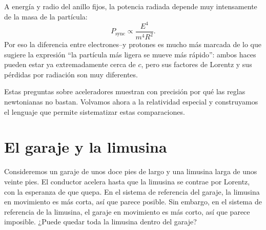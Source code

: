 \begin{classroomqa}\end{classroomqa}

A energía y radio del anillo fijos, la potencia radiada depende muy intensamente de la masa de la partícula:
\begin{equation}
P_{\mathrm{sync}}\propto \frac{E^4}{m^4R^2}.
\end{equation}
Por eso la diferencia entre electrones--y protones es mucho más marcada de lo que sugiere la expresión ``la partícula más ligera se mueve más rápido'': ambos haces pueden estar ya extremadamente cerca de \(c\), pero sus factores de Lorentz y sus pérdidas por radiación son muy diferentes.

\begin{classroomqa}\end{classroomqa}

Estas preguntas sobre aceleradores muestran con precisión por qué las reglas newtonianas no bastan. Volvamos ahora a la relatividad especial y construyamos el lenguaje que permite sistematizar estas comparaciones.

\section{El garaje y la limusina}

Consideremos un garaje de unos doce pies de largo y una limusina larga de unos veinte pies. El conductor acelera hasta que la limusina se contrae por Lorentz, con la esperanza de que quepa. En el sistema de referencia del garaje, la limusina en movimiento es más corta, así que parece posible. Sin embargo, en el sistema de referencia de la limusina, el garaje en movimiento es más corto, así que parece imposible. ¿Puede quedar toda la limusina dentro del garaje?

